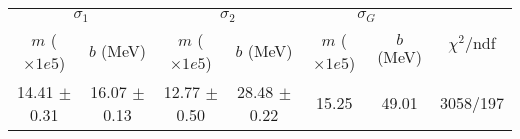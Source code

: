 \begin{tabular}{cc|cc|cc||c}
\multicolumn{2}{c|}{$\sigma_1$} & \multicolumn{2}{|c}{$\sigma_2$} & \multicolumn{2}{|c}{$\sigma_G$}  & \multirow{2}{*}{$\chi^2/$ndf}\\
$m$ ($\times1e5$) & $b$ (MeV) & $m$ ($\times1e5$) & $b$ (MeV) & $m$ ($\times1e5$) & $b$ (MeV) & \\
\hline
14.41 $\pm$ 0.31 & 16.07 $\pm$ 0.13 & 12.77 $\pm$ 0.50 & 28.48 $\pm$ 0.22 & 15.25 & 49.01 & 3058/197\\
\end{tabular}
